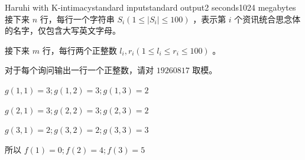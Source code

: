 \begin{problem}{Haruhi with K-intimacy}{standard input}{standard output}{2 seconds}{1024 megabytes}
接下来 $n$ 行，每行一个字符串 $S_i(1 \leq |S_i| \leq 100)$ ，表示第 $i$ 个资讯统合思念体的名字，仅包含大写英文字母。

接下来 $m$ 行，每行两个正整数 $l_i,r_i(1 \leq l_i \leq r_i \leq 100)$ 。

\OutputFile

对于每个询问输出一行一个正整数，请对 $19260817$ 取模。

\Example
\begin{example}
%
\end{example}

\Note

$g(1,1)=3;g(1,2)=3;g(1,3)=2$

$g(2,1)=3;g(2,2)=3;g(2,3)=2$

$g(3,1)=2;g(3,2)=2;g(3,3)=3$

所以 $f(1)=0;f(2)=4;f(3)=5$

\end{problem}
